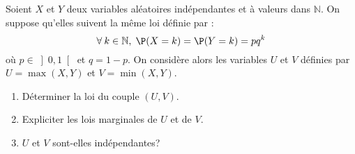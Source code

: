 \documentclass[a4paper,10pt]{report}
\begin{document}
\begin{Exercice}{} Soient $X$ et $Y$ deux variables aléatoires indépendantes et à valeurs dans $\mathbb{N}$. On suppose qu'elles suivent la même loi définie par :
$$\forall\:k\in\mathbb{N}, \; \P(X=k)=\P(Y=k)=pq^k$$
où $p \in \left] 0,1\right[$ et $q=1-p$. On considère alors les variables $U$ et $V$ définies par $U=\max(X,Y)$ et $V=\min(X,Y)$.
\begin{enumerate}
\item
Déterminer la loi du couple $(U,V)$.
\item
Expliciter les lois marginales de $U$ et de $V$.
\item
$U$ et $V$ sont-elles indépendantes?
\end{enumerate}
\end{Exercice}

\corr
\end{document}
